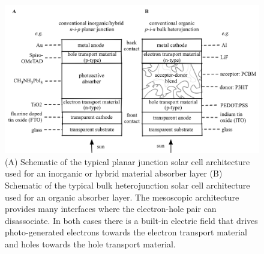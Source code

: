 \begin{figure}[h]
 \centering
   \includegraphics[width=1.0\columnwidth]{figures/ch1/PVarchitecture.png}
   \caption[Typical solar cell architectures]{(A) Schematic of the typical planar junction solar cell architecture used for an inorganic or hybrid material absorber layer (B) Schematic of the typical bulk heterojunction solar cell architecture used for an organic absorber layer. The mesoscopic architecture provides many interfaces where the electron-hole pair can disassociate.  In both cases there is a built-in electric field that drives photo-generated electrons towards the electron transport material and holes towards the hole transport material.}
   \label{SC_architecture}
 \end{figure}



